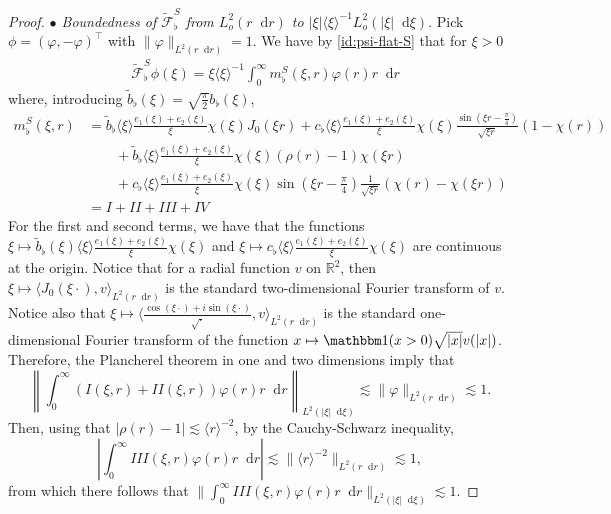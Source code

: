 \documentclass[11 pt]{amsart}
\theoremstyle{definition}
\theoremstyle{remark}
\numberwithin{equation}{section}
\newcommand{\dd}{\mathop{}\!\mathrm{d}}
\begin{document}
\begin{proof}
\noindent \textit{$\bullet$ Boundedness of $\widetilde{\mathcal F}_\flat^S$ from $L^2_{o}(r\dd r)$ to $|\xi| \langle \xi\rangle^{-1}L^2_{o}(|\xi|\dd \xi)$}. Pick $\phi = (\varphi, -\varphi)^\top$ with $\| \varphi\|_{L^2(r\dd r)}= 1$. We have by \eqref{id:psi-flat-S} that for $\xi>0$
\begin{align} \label{id:Fourier-flat-S-odd}
&\widetilde {\mathcal F}_\flat^{S} \phi (\xi) = \xi \langle \xi \rangle^{-1}\int_0^\infty m^S_{\flat}(\xi,r) \varphi(r)r\dd r
\end{align}
where, introducing $\widetilde b_\flat(\xi)=\sqrt{\frac{\pi}{2}}b_\flat(\xi)$,
\begin{align} \label{id:Fourier-inverse-flat-S}
m_\flat^S(\xi,r) & = \widetilde b_\flat \langle \xi \rangle \frac{e_1(\xi)+e_2(\xi)}{\xi}\chi(\xi) J_0(\xi r) +c_\flat \langle \xi \rangle \frac{e_1(\xi)+e_2(\xi)}{\xi}\chi(\xi)  \frac{\sin (\xi r-\frac \pi 4)}{\sqrt{\xi r}}(1-\chi(r)) \\
\nonumber & \qquad  +  \widetilde b_\flat \langle \xi \rangle  \frac{e_1(\xi)+e_2(\xi)}{\xi} \chi(\xi) (\rho(r)-1)\chi(\xi r)  \\
\nonumber & \qquad +c_\flat \langle \xi \rangle \frac{e_1(\xi)+e_2(\xi)}{\xi}\chi(\xi)   \sin \left(\xi r-\frac \pi 4\right) \frac{1}{\sqrt{\xi r}} \left(\chi(r)-\chi(\xi r)\right)\ \\
\nonumber & = I+II+III+IV
\end{align}
For the first and second terms, we have that the functions $\xi \mapsto \widetilde b_\flat (\xi)\langle \xi \rangle \frac{e_1(\xi)+e_2(\xi)}{\xi}\chi(\xi)$ and $\xi \mapsto c_\flat \langle \xi \rangle \frac{e_1(\xi)+e_2(\xi)}{\xi}\chi(\xi)$ are continuous at the origin. Notice that for a radial function $v$ on $\mathbb R^2$, then $\xi \mapsto \langle J_0(\xi \cdot ) ,v\rangle_{L^2(r\dd r)}$ is the standard two-dimensional Fourier transform of $v$. Notice also that $\xi \mapsto \langle \frac{\cos (\xi \cdot)+i\sin (\xi \cdot)}{\sqrt{\cdot}},v\rangle_{L^2(r\dd r)}$ is the standard one-dimensional Fourier transform of the function $x\mapsto \mathbbm 1(x>0)\sqrt{|x|}v(|x|)$. Therefore, the Plancherel theorem in one and two dimensions imply that
$$
\left\| \int_0^\infty (I(\xi,r)+II(\xi,r)) \varphi(r)r\dd r  \right\|_{L^2(|\xi| \dd \xi)}\lesssim \| \varphi\|_{L^2(r \dd r)}  \lesssim 1.
$$
Then, using that $|\rho(r)-1|\lesssim \langle r\rangle^{-2}$, by the Cauchy-Schwarz inequality,
$$
\left| \int_0^\infty III(\xi,r) \varphi(r)r\dd r \right| \lesssim  \| \langle r\rangle^{-2} \|_{L^2(r \dd r)} \lesssim 1,
$$
from which there follows that $\| \int_0^\infty III(\xi,r) \varphi(r)r\dd r  \|_{L^2(|\xi| \dd \xi)} \lesssim 1$.


\end{proof}
\end{document}
